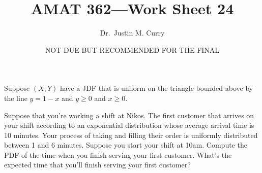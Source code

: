 \documentclass[addpoints,12pt]{exam}
\title{\vspace{-1in} AMAT 362---Work Sheet 24}
\date{NOT DUE BUT RECOMMENDED FOR THE FINAL}
\author{Dr.~Justin M. Curry}
\begin{document}
\maketitle





\begin{questions}

\question Suppose $(X,Y)$ have a JDF that is uniform on the triangle bounded above by the line $y=1-x$ and $y\geq 0$ and $x\geq 0$. 


\noaddpoints
{}
\addpoints

\newpage
\question Suppose that you're working a shift at Nikos. The first customer that arrives on your shift according to an exponential distribution whose average arrival time is 10 minutes. Your process of taking and filling their order is uniformly distributed between 1 and 6 minutes.  Suppose you start your shift at 10am. Compute the PDF of the time when you finish serving your first customer. What's the expected time that you'll finish serving your first customer?


\end{questions}
\end{document}
